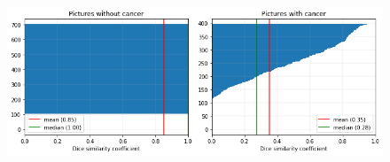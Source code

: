 \begin{figure}[h!]
    \centering
    \includegraphics[width=1.0\textwidth]{images/simcnn_dsc}
    \caption{}
    \label{fig:simcnn_dsc}
\end{figure}



